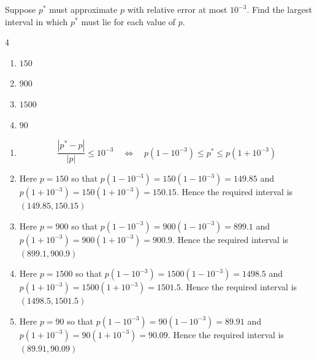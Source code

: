 
\begin{posttest}%
\item Suppose $p^*$ must approximate $p$ with relative error at most $10^{-3}$. Find the largest interval in which $p^*$ must lie for each value of $p$.
\begin{multicols}{4}
\begin{enumerate}[label=(\alph*)]
\item $150$
\item $900$
\item $1500$
\item $90$
\end{enumerate}
\end{multicols}
\begin{mysolution}
\begin{enumerate}[label=(\alph*)]
\item[]
\[\frac{|p^*-p|}{|p|}\leq10^{-3}\quad\Longleftrightarrow\quad p\left(1-10^{-3}\right)\leq p^*\leq p\left(1+10^{-3}\right)\]
\item Here $p=150$ so that $p\left(1-10^{-3}\right)=150\left(1-10^{-3}\right)=149.85$ and $p\left(1+10^{-3}\right)=150\left(1+10^{-3}\right)=150.15$. Hence the required interval is $(149.85,150.15)$
\item Here $p=900$ so that $p\left(1-10^{-3}\right)=900\left(1-10^{-3}\right)=899.1$ and $p\left(1+10^{-3}\right)=900\left(1+10^{-3}\right)=900.9$. Hence the required interval is $(899.1,900.9)$
\item Here $p=1500$ so that $p\left(1-10^{-3}\right)=1500\left(1-10^{-3}\right)=1498.5$ and $p\left(1+10^{-3}\right)=1500\left(1+10^{-3}\right)=1501.5$. Hence the required interval is $(1498.5,1501.5)$
\item Here $p=90$ so that $p\left(1-10^{-3}\right)=90\left(1-10^{-3}\right)=89.91$ and $p\left(1+10^{-3}\right)=90\left(1+10^{-3}\right)=90.09$. Hence the required interval is $(89.91,90.09)$
\end{enumerate}


\end{mysolution}
\end{posttest}
